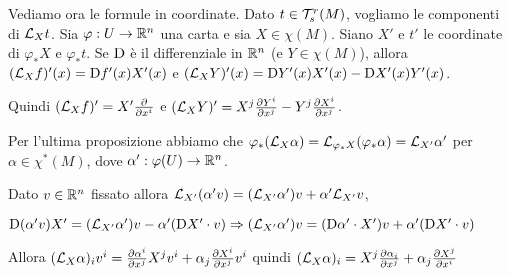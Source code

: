Vediamo ora le formule in coordinate.
Dato $t\in\mathcal T_s^r(M)$, vogliamo le componenti di $\mathcal L_Xt$.
Sia $\varphi: U \to \mathbb R^n$ una carta e sia $X\in\chi(M)$. Siano $X'$ e $t'$ le coordinate di $\varphi_*X$ e $\varphi_*t$.
Se $\mathrm D$ è il differenziale in $\mathbb R^n$ (e $Y\in\chi(M)$), allora
$(\mathcal L_Xf)' (x) = \mathrm D f'(x) X'(x)$ e $(\mathcal L_XY)'(x) = \mathrm D Y'(x)X'(x) - \mathrm D X'(x)Y'(x)$.

Quindi $(\mathcal L_X f)' = X' \frac{\partial }{\partial x^i}$ e $(\mathcal L_XY)' = X^j\frac{\partial Y^i}{\partial x^j} - Y^j\frac{\partial X^i}{\partial x^j}$.

Per l'ultima proposizione abbiamo che $\varphi_*(\mathcal L_X\alpha) = \mathcal L_{\varphi_*X}(\varphi_*\alpha) = \mathcal L_{X'}\alpha'$ per $\alpha\in\chi^*(M)$, dove $\alpha' : \varphi(U)\to\mathbb R^n$.

Dato $v\in\mathbb R^n$ fissato allora $\mathcal L_{X'}(\alpha'v) = (\mathcal L_{X'}\alpha')v + \alpha'\mathcal L_{X'}v$,

$\mathrm D (\alpha'v)X' = (\mathcal L_{X'} \alpha') v - \alpha'(\mathrm D X' \cdot v) \Rightarrow (\mathcal L_{X'}\alpha') v = (\mathrm D \alpha' \cdot X') v + \alpha' (\mathrm D X' \cdot v)$ 

Allora $(\mathcal L_X\alpha)_iv^i = \frac{\partial \alpha^i}{\partial x^j}X^jv^i + \alpha_j\frac{\partial X^i}{\partial x^j}v^i$
quindi $(\mathcal L_X\alpha)_i = X^j\frac{\partial \alpha_i}{\partial x^j} + \alpha_j\frac{\partial X^j}{\partial x^i}$




































































